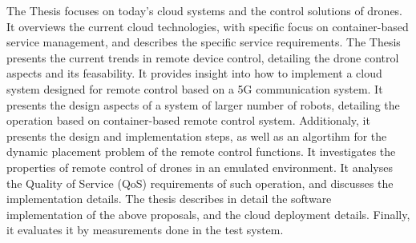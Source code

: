 The Thesis focuses on today’s cloud systems and the control solutions of drones. It overviews the current cloud technologies, with specific focus on container-based service management, and describes the specific service requirements. The Thesis presents the current trends in remote device control, detailing the drone control aspects and its feasability.  It provides insight into how to implement a cloud system designed for remote control based on a 5G communication system. It presents the design aspects of a system of larger number of robots, detailing the operation based on container-based remote control system. Additionaly, it presents the design and implementation steps, as well as an algortihm for the dynamic placement problem of the remote control functions. It investigates the properties of remote control of drones in an emulated environment. It analyses the Quality of Service (QoS) requirements of such operation, and discusses the implementation details. The thesis describes in detail the software implementation of the above proposals, and the cloud deployment details. Finally, it evaluates it by measurements done in the test system.

\vfill
\selectthesislanguage

\setcounter{romanPage}{\value{page}}
